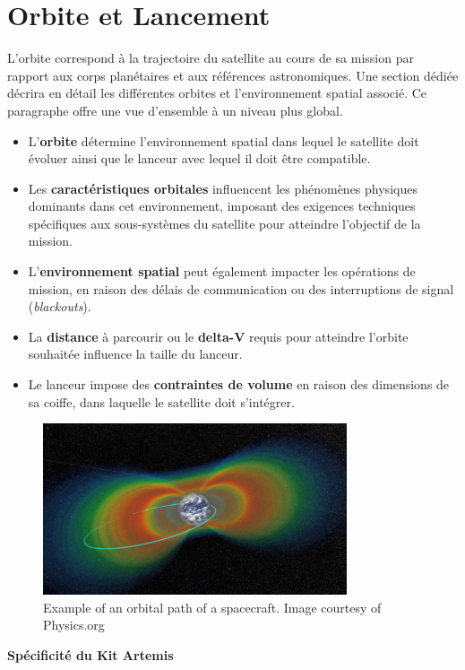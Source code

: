 \section*{Orbite et Lancement}

L'orbite correspond à la trajectoire du satellite au cours de sa mission par rapport aux corps planétaires et aux références astronomiques. Une section dédiée décrira en détail les différentes orbites et l’environnement spatial associé. Ce paragraphe offre une vue d’ensemble à un niveau plus global.

\begin{itemize}
    \item L’\textbf{orbite} détermine l’environnement spatial dans lequel le satellite doit évoluer ainsi que le lanceur avec lequel il doit être compatible.
    \item Les \textbf{caractéristiques orbitales} influencent les phénomènes physiques dominants dans cet environnement, imposant des exigences techniques spécifiques aux sous-systèmes du satellite pour atteindre l’objectif de la mission.
    \item L’\textbf{environnement spatial} peut également impacter les opérations de mission, en raison des délais de communication ou des interruptions de signal (\textit{blackouts}).
    \item La \textbf{distance} à parcourir ou le \textbf{delta-V} requis pour atteindre l’orbite souhaitée influence la taille du lanceur.
    \item Le lanceur impose des \textbf{contraintes de volume} en raison des dimensions de sa coiffe, dans laquelle le satellite doit s’intégrer.
\end{itemize}
\begin{figure}[H] %
    \centering
    \includegraphics[width=0.8\textwidth]{figures/nasasvanalle.png}
    \caption{Example of an orbital path of a spacecraft. Image courtesy of Physics.org}
    \label{fig:communication2}
\end{figure}
\textbf{Spécificité du Kit Artemis}

